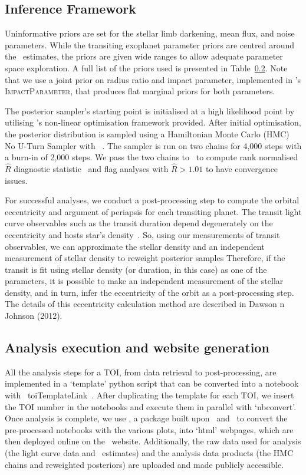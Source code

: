 \documentclass[floatfix,ApJL,twocolumn]{aastex631}
\begin{document}
\subsection{Inference Framework}

Uninformative priors are set for the stellar limb darkening, mean flux, and noise parameters. 
While the transiting exoplanet parameter priors are centred around the \exofop\ estimates, the priors are given wide ranges to allow adequate parameter space exploration.
A full list of the priors used is presented in Table~\ref{}. 
Note that we use a joint prior on radius ratio and impact parameter, implemented in \exoplanet's \textsc{ImpactParameter}, that produces flat marginal priors for both parameters. 

The posterior sampler's starting point is initialised at a high likelihood point by utilising \exoplanet's non-linear optimisation framework provided.
After initial optimisation, the posterior distribution is sampled using a Hamiltonian Monte Carlo (HMC) No U-Turn Sampler with \pymc~\citep{}.
The sampler is run on two chains for 4,000 steps with a burn-in of 2,000 steps.
We pass the two chains to \arviz\ to compute rank normalised $\hat{R}$ diagnostic statistic~\cite{Vehtari:2019:arXiv} and flag analyses with $\hat{R}>1.01$ to have convergence issues. 

For successful analyses, we conduct a post-processing step to compute the orbital eccentricity and argument of periapsis for each transiting planet. 
The transit light curve observables such as the transit duration depend degenerately on the eccentricity and hosts star's density~\citep{Dawson:2012:ApJ}. 
So, using our measurements of transit observables, we can approximate the stellar density and an independent measurement of stellar density to reweight posterior samples 
 Therefore, if the transit is fit using stellar density (or duration, in this case) as one of the parameters, it is possible to make an independent measurement of the stellar density, and in turn, infer the eccentricity of the orbit as a post-processing step. The details of this eccentricity calculation method are described in Dawson n Johnson (2012).

\subsection{Analysis execution and website generation}

All the analysis steps for a TOI, from data retrieval to post-processing, are implemented in a `template' python script that can be converted into a \jupyter notebook with \jupytext~toiTemplateLink~\cite{}.
After duplicating the template for each TOI, we insert the TOI number in the notebooks and execute them in parallel with `nbconvert'. 
Once analysis is complete, we use \jupyterbook, a package built upon \sphinx\ and \nbconvert\   to convert the pre-processed notebooks with the various plots, into `html' webpages, which are then deployed online on the \tessAtlas\ website. 
Additionally, the raw data used for analysis (the light curve data and \exofop\ estimates) and the analysis data products (the HMC chains and reweighted posteriors) are uploaded and made publicly accessible. 
\end{document}

